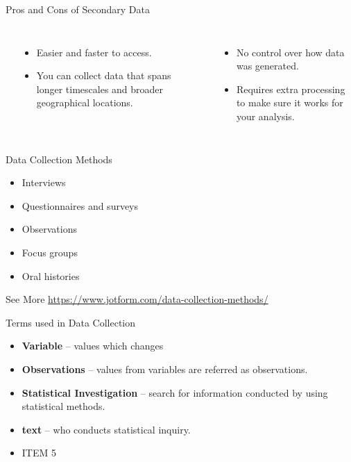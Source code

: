 \begin{frame}[t]{Pros and Cons of Secondary Data}
	\begin{columns}[T]
		 \\ 
		\begin{itemize}
			\item Easier and faster to access.
			\item You can collect data that spans longer timescales and broader 
			geographical locations.
		\end{itemize}
		 \\ 
		\begin{itemize}
			\item No control over how data was generated.
			\item Requires extra processing to make sure it works for your 
			analysis.
		\end{itemize}
	\end{columns}
\end{frame}


\begin{frame}[t]{Data Collection Methods}
	\begin{itemize}
		\item Interviews
		\item Questionnaires and surveys
		\item Observations
		\item Focus groups
		\item Oral histories
	\end{itemize}
See More \url{https://www.jotform.com/data-collection-methods/}
\end{frame}

\begin{frame}[t]{Terms used in Data Collection}
	\begin{itemize}
		\item \textbf{Variable} – values which changes
		\item \textbf{Observations} – values from variables are referred as 
		observations.
		\item \textbf{Statistical Investigation} – search for information 
		conducted by using statistical methods.
		\item \textbf{text} – who conducts statistical inquiry.
		\item ITEM 5
	\end{itemize}
\end{frame}

